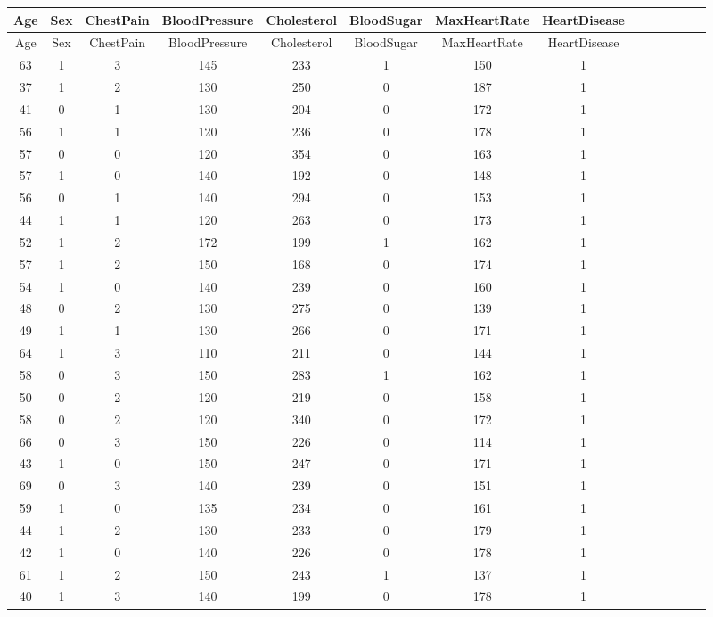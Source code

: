 \documentclass{article}
\begin{document}
\begin{center}
\begin{longtable}{|c|c|c|c|c|c|c|c|c|c|c|c|c|c|}
\hline
Age & Sex & ChestPain & BloodPressure & Cholesterol & BloodSugar & MaxHeartRate & HeartDisease \\
\hline
\endfirsthead
\hline
Age & Sex & ChestPain & BloodPressure & Cholesterol & BloodSugar & MaxHeartRate & HeartDisease \\
\hline
\endhead
63 & 1 & 3 & 145 & 233 & 1 & 150 & 1 \\
\hline
37 & 1 & 2 & 130 & 250 & 0 & 187 & 1 \\
\hline
41 & 0 & 1 & 130 & 204 & 0 & 172 & 1 \\
\hline
56 & 1 & 1 & 120 & 236 & 0 & 178 & 1 \\
\hline
57 & 0 & 0 & 120 & 354 & 0 & 163 & 1 \\
\hline
57 & 1 & 0 & 140 & 192 & 0 & 148 & 1 \\
\hline
56 & 0 & 1 & 140 & 294 & 0 & 153 & 1 \\
\hline
44 & 1 & 1 & 120 & 263 & 0 & 173 & 1 \\
\hline
52 & 1 & 2 & 172 & 199 & 1 & 162 & 1 \\
\hline
57 & 1 & 2 & 150 & 168 & 0 & 174 & 1 \\
\hline
54 & 1 & 0 & 140 & 239 & 0 & 160 & 1 \\
\hline
48 & 0 & 2 & 130 & 275 & 0 & 139 & 1 \\
\hline
49 & 1 & 1 & 130 & 266 & 0 & 171 & 1 \\
\hline
64 & 1 & 3 & 110 & 211 & 0 & 144 & 1 \\
\hline
58 & 0 & 3 & 150 & 283 & 1 & 162 & 1 \\
\hline
50 & 0 & 2 & 120 & 219 & 0 & 158 & 1 \\
\hline
58 & 0 & 2 & 120 & 340 & 0 & 172 & 1 \\
\hline
66 & 0 & 3 & 150 & 226 & 0 & 114 & 1 \\
\hline
43 & 1 & 0 & 150 & 247 & 0 & 171 & 1 \\
\hline
69 & 0 & 3 & 140 & 239 & 0 & 151 & 1 \\
\hline
59 & 1 & 0 & 135 & 234 & 0 & 161 & 1 \\
\hline
44 & 1 & 2 & 130 & 233 & 0 & 179 & 1 \\
\hline
42 & 1 & 0 & 140 & 226 & 0 & 178 & 1 \\
\hline
61 & 1 & 2 & 150 & 243 & 1 & 137 & 1 \\
\hline
40 & 1 & 3 & 140 & 199 & 0 & 178 & 1 \\

\end{longtable}
\end{center}
\end{document}
